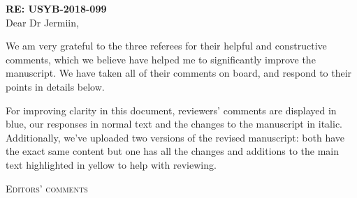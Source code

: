 \documentclass[12pt,letterpaper]{article}
\renewcommand{\section}[1]{%
\bigskip
\begin{center}
\begin{Large}
\normalfont\scshape #1
\medskip
\end{Large}
\end{center}}
\begin{document}
\textbf{RE: USYB-2018-099}\\
\bigskip
Dear Dr Jermiin,\\
\bigskip

We am very grateful to the three referees for their helpful and constructive comments, which we believe have helped me to significantly improve the manuscript.
We have taken all of their comments on board, and respond to their points in details below.

For improving clarity in this document, reviewers' comments are displayed in blue, our responses in normal text and the changes to the manuscript in italic.
Additionally, we've uploaded two versions of the revised manuscript: both have the exact same content but one has all the changes and additions to the main text highlighted in yellow to help with reviewing.

\section{Editors' comments}
\end{document}
